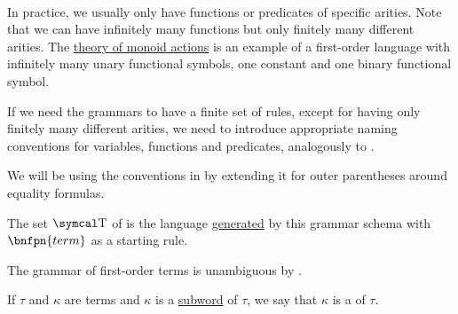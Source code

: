 \begin{definition}
\begin{DefEnum}
\begin{bnf*}
      \bnfmore                  {\hspace{3cm} \vdots} \\
       \\
      \bnfmore                  {\hspace{3cm} \vdots} \\
               { \bnfor} \\
       \\
       \\
    \end{bnf*}

    In practice, we usually only have functions or predicates of specific arities. Note that we can have infinitely many functions but only finitely many different arities. The \hyperref[remark:theory_of_left_monoid_actions]{theory of monoid actions} is an example of a first-order language with infinitely many unary functional symbols, one constant and one binary functional symbol.

    If we need the grammars to have a finite set of rules, except for having only finitely many different arities, we need to introduce appropriate naming conventions for variables, functions and predicates, analogously to .

    We will be using the conventions in  by extending it for outer parentheses around equality formulas.

    The set \( \CT \) of  is the language \hyperref[def:grammar_derivation/grammar_language]{generated} by this grammar schema with \( \bnfpn{term} \) as a starting rule.

    The grammar of first-order terms is unambiguous by .

     If \( \tau \) and \( \kappa \) are terms and \( \kappa \) is a \hyperref[def:language/subword]{subword} of \( \tau \), we say that \( \kappa \) is a  of \( \tau \).


\end{DefEnum}
\end{definition}
